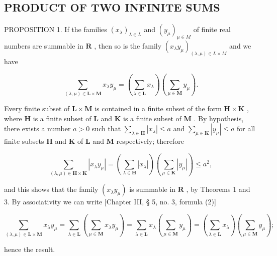 \subsection{PRODUCT OF TWO INFINITE SUMS}

PROPOSITION 1. If the families \((x_{\lambda})_{\lambda \in L}\) and \((y_{\mu})_{\mu \in M}\) of finite real numbers are summable in \(\mathbf{R}\) , then so is the family \((x_{\lambda}y_{\mu})_{(\lambda ,\mu)\in L\times M}\) and we have

\[
\sum_ {(\lambda , \mu) \in \mathbf {L} \times \mathbf {M}} x _ {\lambda} y _ {\mu} = (\sum_ {\lambda \in \mathbf {L}} x _ {\lambda}) (\sum_ {\mu \in \mathbf {M}} y _ {\mu}).\tag{1}
\]

Every finite subset of \(\mathbf{L} \times \mathbf{M}\) is contained in a finite subset of the form \(\mathbf{H} \times \mathbf{K}\) , where \(\mathbf{H}\) is a finite subset of \(\mathbf{L}\) and \(\mathbf{K}\) is a finite subset of \(\mathbf{M}\) . By hypothesis, there exists a number \(a > 0\) such that \(\sum_{\lambda \in \mathbf{H}} |x_{\lambda}| \leqslant a\) and \(\sum_{\mu \in \mathbf{K}} |y_{\mu}| \leqslant a\) for all finite subsets \(\mathbf{H}\) and \(\mathbf{K}\) of \(\mathbf{L}\) and \(\mathbf{M}\) respectively; therefore

\[
\sum_ {(\lambda , \mu) \in \mathbf {H} \times \mathbf {K}} | x _ {\lambda} y _ {\mu} | = (\sum_ {\lambda \in \mathbf {H}} | x _ {\lambda} |) (\sum_ {\mu \in \mathbf {K}} | y _ {\mu} |) \leqslant a ^ {2},
\]

and this shows that the family \((x_{\lambda}y_{\mu})\) is summable in \(\mathbf{R}\) , by Theorems 1 and 3. By associativity we can write {[}Chapter III, § 5, no. 3, formula (2){]}

\[
\sum_ {(\lambda , \mu) \in \mathbf {L} \times \mathbf {M}} x _ {\lambda} y _ {\mu} = \sum_ {\lambda \in \mathbf {L}} (\sum_ {\mu \in \mathbf {M}} x _ {\lambda} y _ {\mu}) = \sum_ {\lambda \in \mathbf {L}} x _ {\lambda} (\sum_ {\mu \in \mathbf {M}} y _ {\mu}) = (\sum_ {\lambda \in \mathbf {L}} x _ {\lambda}) (\sum_ {\mu \in \mathbf {M}} y _ {\mu});
\]

hence the result.

